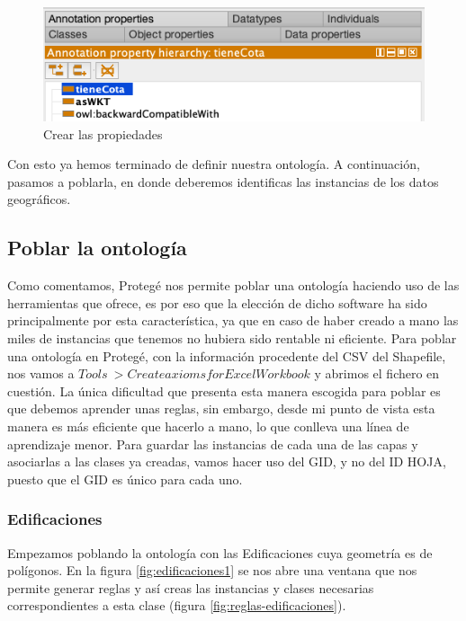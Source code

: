 \begin{figure}[H]
	\centering
	\includegraphics[width=0.7\linewidth]{imagenes/capitulo5/propiedad}
	\caption{Crear las propiedades}
	\label{fig:propiedad}
\end{figure}

Con esto ya hemos terminado de definir nuestra ontología. A continuación, pasamos a poblarla, en donde deberemos identificas las instancias de los datos geográficos.

\subsection{Poblar la ontología}

Como comentamos, Protegé nos permite poblar una ontología haciendo uso de las herramientas que ofrece, es por eso que la elección de dicho software ha sido principalmente por esta característica, ya que en caso de haber creado a mano las miles de instancias que tenemos no hubiera sido rentable ni eficiente. Para poblar una ontología en Protegé,  con la información procedente del CSV del Shapefile, nos vamos a $Tools\ > Create axioms for Excel Workbook$ y abrimos el fichero en cuestión. La única dificultad que presenta esta manera escogida para poblar es que debemos aprender unas reglas, sin embargo, desde mi punto de vista esta manera es más eficiente que hacerlo a mano, lo que conlleva una línea de aprendizaje menor. Para guardar las instancias de cada una de las capas y asociarlas a las clases ya creadas, vamos hacer uso del GID, y no del ID HOJA, puesto que el GID es único para cada uno.



\subsubsection{Edificaciones}

Empezamos poblando la ontología con las Edificaciones cuya geometría es de polígonos. En la figura \ref{fig:edificaciones1} se nos abre una ventana que nos permite generar reglas y así creas las instancias y clases necesarias correspondientes a esta clase (figura \ref{fig:reglas-edificaciones}).

